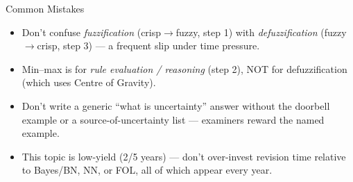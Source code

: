 \documentclass[12pt,a4paper]{article}
\begin{document}
\begin{warnbox}{Common Mistakes}
\begin{itemize}[noitemsep]
  \item Don't confuse \emph{fuzzification} (crisp$\to$fuzzy, step 1) with \emph{defuzzification} (fuzzy$\to$crisp, step 3) --- a frequent slip under time pressure.
  \item Min--max is for \emph{rule evaluation / reasoning} (step 2), NOT for defuzzification (which uses Centre of Gravity).
  \item Don't write a generic ``what is uncertainty'' answer without the doorbell example or a source-of-uncertainty list --- examiners reward the named example.
  \item This topic is low-yield (2/5 years) --- don't over-invest revision time relative to Bayes/BN, NN, or FOL, all of which appear every year.
\end{itemize}
\end{warnbox}
\end{document}
